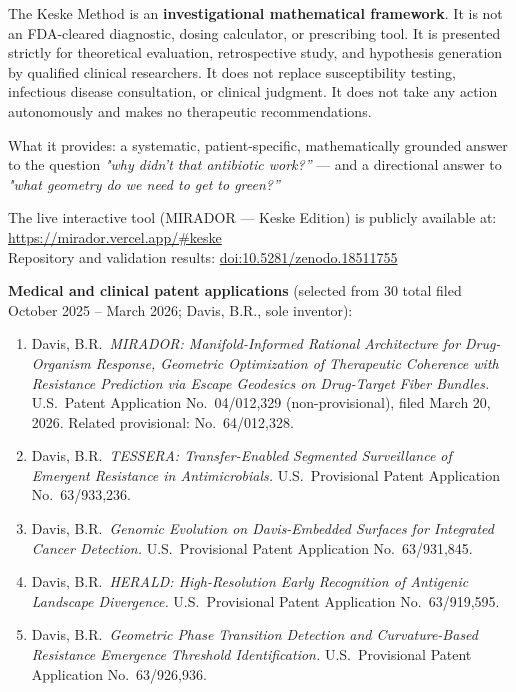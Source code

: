 \documentclass[11pt]{article}
\begin{document}
The Keske Method is an \textbf{investigational mathematical framework}. It is not an
FDA-cleared diagnostic, dosing calculator, or prescribing tool. It is presented
strictly for theoretical evaluation, retrospective study, and hypothesis generation
by qualified clinical researchers. It does not replace susceptibility testing,
infectious disease consultation, or clinical judgment. It does not take any action
autonomously and makes no therapeutic recommendations.

What it provides: a systematic, patient-specific, mathematically grounded
answer to the question \textit{"why didn't that antibiotic work?''} — and a
directional answer to \textit{"what geometry do we need to get to green?''}

The live interactive tool (MIRADOR — Keske Edition) is publicly available at:\\
\url{https://mirador.vercel.app/\#keske}\\[2pt]
Repository and validation results: \href{https://doi.org/10.5281/zenodo.18511755}{doi:10.5281/zenodo.18511755}

\vspace{6pt}
\textbf{Medical and clinical patent applications} (selected from 30 total filed October 2025 –
March 2026; Davis, B.R., sole inventor):

\begin{enumerate}[leftmargin=1.6em, itemsep=2pt]
  \item Davis, B.R.\ \textit{MIRADOR: Manifold-Informed Rational Architecture for
        Drug-Organism Response, Geometric Optimization of Therapeutic Coherence with
        Resistance Prediction via Escape Geodesics on Drug-Target Fiber Bundles.}
        U.S.\ Patent Application No.~04/012,329 (non-provisional),
        filed March 20, 2026.
        Related provisional: No.~64/012,328.

  \item Davis, B.R.\ \textit{TESSERA: Transfer-Enabled Segmented Surveillance of
        Emergent Resistance in Antimicrobials.}
        U.S.\ Provisional Patent Application No.~63/933,236.

  \item Davis, B.R.\ \textit{Genomic Evolution on Davis-Embedded Surfaces for
        Integrated Cancer Detection.}
        U.S.\ Provisional Patent Application No.~63/931,845.

  \item Davis, B.R.\ \textit{HERALD: High-Resolution Early Recognition of Antigenic
        Landscape Divergence.}
        U.S.\ Provisional Patent Application No.~63/919,595.

  \item Davis, B.R.\ \textit{Geometric Phase Transition Detection and Curvature-Based
        Resistance Emergence Threshold Identification.}
        U.S.\ Provisional Patent Application No.~63/926,936.
\end{enumerate}
\end{document}
